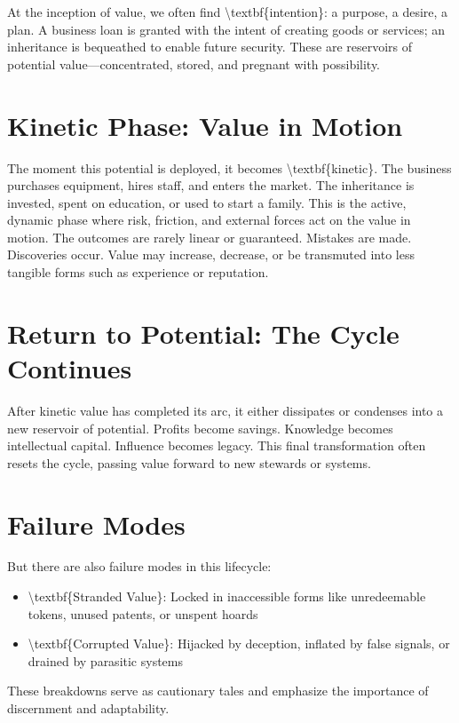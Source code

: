 \documentclass[11pt,oneside]{book}
\begin{document}
At the inception of value, we often find \textbackslash textbf\{intention\}: a purpose, a desire, a plan. A business loan is granted with the intent of creating goods or services; an inheritance is bequeathed to enable future security. These are reservoirs of potential value—concentrated, stored, and pregnant with possibility.

\section{Kinetic Phase: Value in Motion}

The moment this potential is deployed, it becomes \textbackslash textbf\{kinetic\}. The business purchases equipment, hires staff, and enters the market. The inheritance is invested, spent on education, or used to start a family. This is the active, dynamic phase where risk, friction, and external forces act on the value in motion. The outcomes are rarely linear or guaranteed. Mistakes are made. Discoveries occur. Value may increase, decrease, or be transmuted into less tangible forms such as experience or reputation.

\section{Return to Potential: The Cycle Continues}

After kinetic value has completed its arc, it either dissipates or condenses into a new reservoir of potential. Profits become savings. Knowledge becomes intellectual capital. Influence becomes legacy. This final transformation often resets the cycle, passing value forward to new stewards or systems.

\section{Failure Modes}

But there are also failure modes in this lifecycle:

\begin{itemize}
\item \textbackslash textbf\{Stranded Value\}: Locked in inaccessible forms like unredeemable tokens, unused patents, or unspent hoards
\item \textbackslash textbf\{Corrupted Value\}: Hijacked by deception, inflated by false signals, or drained by parasitic systems
\end{itemize}

These breakdowns serve as cautionary tales and emphasize the importance of discernment and adaptability.
\end{document}
